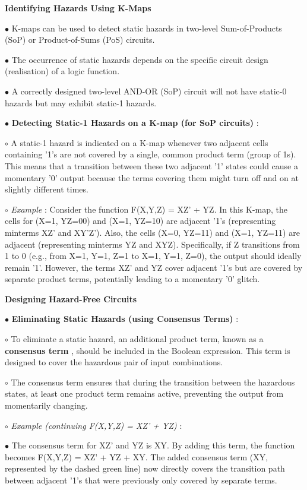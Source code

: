 \documentclass{article}
\begin{document}
\textbf{Identifying Hazards Using K-Maps}

$\bullet$ K-maps can be used to detect static hazards in two-level Sum-of-Products (SoP) or Product-of-Sums (PoS) circuits.

$\bullet$ The occurrence of static hazards depends on the specific circuit design (realisation) of a logic function.

$\bullet$ A correctly designed two-level AND-OR (SoP) circuit will not have static-0 hazards but may exhibit static-1 hazards.

$\bullet$ \textbf{Detecting Static-1 Hazards on a K-map (for SoP circuits)} :

    $\circ$ A static-1 hazard is indicated on a K-map whenever two adjacent cells containing '1's are not covered by a single, common product term (group of 1s). This means that a transition between these two adjacent '1' states could cause a momentary '0' output because the terms covering them might turn off and on at slightly different times.

    $\circ$ \textit{Example} : Consider the function F(X,Y,Z) = XZ' + YZ.  In this K-map, the cells for (X=1, YZ=00) and (X=1, YZ=10) are adjacent '1's (representing minterms XZ' and XY'Z'). Also, the cells (X=0, YZ=11) and (X=1, YZ=11) are adjacent (representing minterms YZ and XYZ). Specifically, if Z transitions from 1 to 0 (e.g., from X=1, Y=1, Z=1 to X=1, Y=1, Z=0), the output should ideally remain '1'. However, the terms XZ' and YZ cover adjacent '1's but are covered by separate product terms, potentially leading to a momentary '0' glitch.

\textbf{Designing Hazard-Free Circuits}

$\bullet$ \textbf{Eliminating Static Hazards (using Consensus Terms)} :

    $\circ$ To eliminate a static hazard, an additional product term, known as a \textbf{consensus term} , should be included in the Boolean expression. This term is designed to cover the hazardous pair of input combinations.

    $\circ$ The consensus term ensures that during the transition between the hazardous states, at least one product term remains active, preventing the output from momentarily changing.

    $\circ$ \textit{Example (continuing F(X,Y,Z) = XZ' + YZ)} :

        $\bullet$ The consensus term for XZ' and YZ is XY. By adding this term, the function becomes F(X,Y,Z) = XZ' + YZ + XY.  The added consensus term (XY, represented by the dashed green line) now directly covers the transition path between adjacent '1's that were previously only covered by separate terms.
\end{document}
